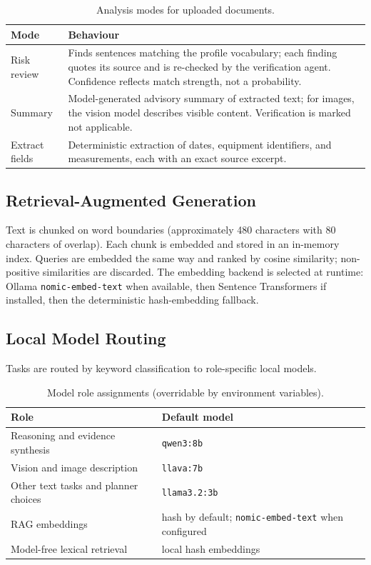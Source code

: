 \documentclass[11pt,a4paper]{article}
\begin{document}
\begin{table}[htbp]
\centering
\small
\begin{tabular}{@{}p{3.0cm} p{11.2cm}@{}}
\toprule
\textbf{Mode} & \textbf{Behaviour} \\
\midrule
Risk review & Finds sentences matching the profile vocabulary; each finding quotes its source and is re-checked by the verification agent. Confidence reflects match strength, not a probability. \\
Summary & Model-generated advisory summary of extracted text; for images, the vision model describes visible content. Verification is marked not applicable. \\
Extract fields & Deterministic extraction of dates, equipment identifiers, and measurements, each with an exact source excerpt. \\
\bottomrule
\end{tabular}
\caption{Analysis modes for uploaded documents.}
\end{table}

\subsection{Retrieval-Augmented Generation}
Text is chunked on word boundaries (approximately 480 characters with 80
characters of overlap). Each chunk is embedded and stored in an in-memory
index. Queries are embedded the same way and ranked by cosine similarity;
non-positive similarities are discarded. The embedding backend is selected at
runtime: Ollama \texttt{nomic-embed-text} when available, then Sentence
Transformers if installed, then the deterministic hash-embedding fallback.

\subsection{Local Model Routing}
Tasks are routed by keyword classification to role-specific local models.

\begin{table}[htbp]
\centering
\small
\begin{tabular}{@{}p{6.4cm} p{7.8cm}@{}}
\toprule
\textbf{Role} & \textbf{Default model} \\
\midrule
Reasoning and evidence synthesis & \texttt{qwen3:8b} \\
Vision and image description & \texttt{llava:7b} \\
Other text tasks and planner choices & \texttt{llama3.2:3b} \\
RAG embeddings & hash by default; \texttt{nomic-embed-text} when configured \\
\midrule
Model-free lexical retrieval & local hash embeddings \\
\bottomrule
\end{tabular}
\caption{Model role assignments (overridable by environment variables).}
\end{table}
\end{document}
